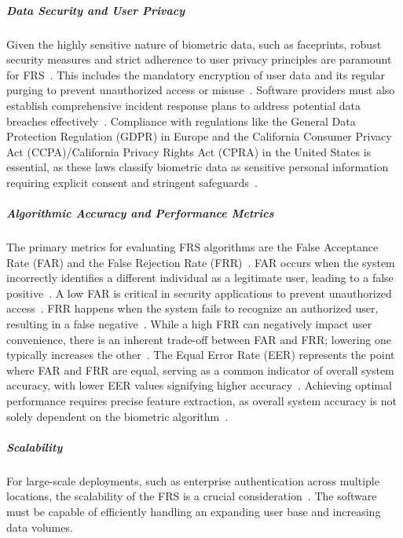 \subparagraph{Data Security and User Privacy}
Given the highly sensitive nature of biometric data, such as faceprints, robust security measures and strict adherence to user privacy principles are paramount for FRS~\cite{getfocal_biometric_2025, transcend_ccpa_2025}. This includes the mandatory encryption of user data and its regular purging to prevent unauthorized access or misuse~\cite{getfocal_biometric_2025}. Software providers must also establish comprehensive incident response plans to address potential data breaches effectively~\cite{getfocal_biometric_2025}. Compliance with regulations like the General Data Protection Regulation (GDPR) in Europe and the California Consumer Privacy Act (CCPA)/California Privacy Rights Act (CPRA) in the United States is essential, as these laws classify biometric data as sensitive personal information requiring explicit consent and stringent safeguards~\cite{getfocal_biometric_2025, transcend_ccpa_2025}.

\subparagraph{Algorithmic Accuracy and Performance Metrics}
The primary metrics for evaluating FRS algorithms are the False Acceptance Rate (FAR) and the False Rejection Rate (FRR)~\cite{recfaces_false_2024, kairos_secret_2018}. FAR occurs when the system incorrectly identifies a different individual as a legitimate user, leading to a false positive~\cite{recfaces_false_2024, kairos_secret_2018}. A low FAR is critical in security applications to prevent unauthorized access~\cite{recfaces_false_2024}. FRR happens when the system fails to recognize an authorized user, resulting in a false negative~\cite{recfaces_false_2024, kairos_secret_2018}. While a high FRR can negatively impact user convenience, there is an inherent trade-off between FAR and FRR; lowering one typically increases the other~\cite{recfaces_false_2024, kairos_secret_2018}. The Equal Error Rate (EER) represents the point where FAR and FRR are equal, serving as a common indicator of overall system accuracy, with lower EER values signifying higher accuracy~\cite{recfaces_false_2024, kairos_secret_2018}. Achieving optimal performance requires precise feature extraction, as overall system accuracy is not solely dependent on the biometric algorithm~\cite{kairos_secret_2018}.

\subparagraph{Scalability}
For large-scale deployments, such as enterprise authentication across multiple locations, the scalability of the FRS is a crucial consideration~\cite{securityindustry_2025_transforming}. The software must be capable of efficiently handling an expanding user base and increasing data volumes.

